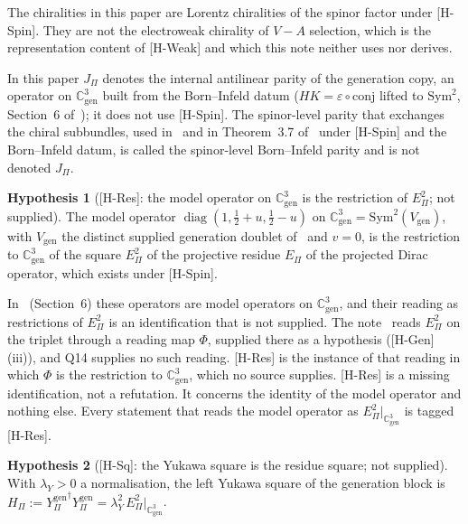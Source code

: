 \documentclass[11pt]{article}
\theoremstyle{definition}
\newtheorem{hypothesis}{Hypothesis}
\theoremstyle{remark}
\newcommand{\JPi}{J_{\Pi}}
\newcommand{\Cgen}{\mathbb{C}^{3}_{\mathrm{gen}}}
\newcommand{\Epi}{E_{\Pi}}
\newcommand{\Ygen}{{Y^{\mathrm{gen}}_{\Pi}}}
\newcommand{\Hpi}{H_{\Pi}}
\newcommand{\lamY}{\lambda_{Y}}
\newcommand{\Sym}{\mathrm{Sym}}
\newcommand{\diag}{\operatorname{diag}}
\begin{document}
    The chiralities in this paper are Lorentz chiralities of the spinor factor under [H-Spin].
    They are not the electroweak chirality of $V{-}A$ selection, which is the representation content of [H-Weak] and
    which this note neither uses nor derives.

    In this paper $\JPi$ denotes the internal antilinear parity of the generation copy, an operator on $\Cgen$ built
    from the Born--Infeld datum ($HK = \varepsilon \circ \mathrm{conj}$ lifted to $\Sym^{2}$, Section~6
    of~\cite{Beau2026q14}); it does not use [H-Spin].
    The spinor-level parity that exchanges the chiral subbundles, used in~\cite{Beau2026ebj} and in Theorem~3.7
    of~\cite{Beau2026q14} under [H-Spin] and the Born--Infeld datum, is called the spinor-level Born--Infeld parity
    and is not denoted $\JPi$.

    \begin{hypothesis}[{[H-Res]}: the model operator on $\Cgen$ is the restriction of $\Epi^{2}$; not supplied]
      \label{hyp:identification}
      The model operator $\diag(1, \tfrac12 + u, \tfrac12 - u)$ on $\Cgen = \Sym^{2}(V_{\mathrm{gen}})$, with
      $V_{\mathrm{gen}}$ the distinct supplied generation doublet of~\cite{Beau2026q14} and $v = 0$, is the
      restriction to $\Cgen$ of the square $\Epi^{2}$ of the projective residue $\Epi$ of the projected Dirac
      operator, which exists under [H-Spin].
    \end{hypothesis}

    In~\cite{Beau2026q14} (Section~6) these operators are model operators on $\Cgen$, and their reading as
    restrictions of $\Epi^{2}$ is an identification that is not supplied.
    The note~\cite{Beau2026prs} reads $\Epi^{2}$ on the triplet through a reading map $\Phi$, supplied there as a
    hypothesis ([H-Gen](iii)), and Q14 supplies no such reading.
    [H-Res] is the instance of that reading in which $\Phi$ is the restriction to $\Cgen$, which no source supplies.
    [H-Res] is a missing identification, not a refutation.
    It concerns the identity of the model operator and nothing else.
    Every statement that reads the model operator as $\Epi^{2}|_{\Cgen}$ is tagged [H-Res].

    \begin{hypothesis}[{[H-Sq]}: the Yukawa square is the residue square; not supplied]
      \label{hyp:square}
      With $\lamY > 0$ a normalisation, the left Yukawa square of the generation block is
      $\Hpi := \Ygen^{\dagger}\Ygen = \lamY^{2}\,\Epi^{2}|_{\Cgen}$.
    \end{hypothesis}
\end{document}
